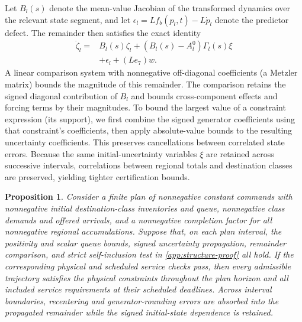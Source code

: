 \documentclass[preprint,12pt]{elsarticle}
\newtheorem{proposition}{Proposition}
\newcommand{\appref}[1]{\ref{#1}}
\begin{document}
Let $B_l(s)$ denote the mean-value Jacobian of the transformed dynamics over
the relevant state segment, and let
$\epsilon_l=L f_b(p_l,t)-L\dot p_l$ denote the predictor defect. The remainder
then satisfies the exact identity
\begin{equation}
 \begin{aligned}
 \dot\zeta_l={}&B_l(s)\zeta_l+(B_l(s)-A_l^0)\Gamma_l(s)\xi\\
              &+\epsilon_l+(Le_7)w.
 \end{aligned}
 \label{eq:structure-remainder-identity}
\end{equation}
A linear comparison system with nonnegative off-diagonal coefficients
(a Metzler matrix) bounds the magnitude of this remainder. The comparison
retains the signed diagonal contribution of $B_l$ and bounds cross-component
effects and forcing terms by their magnitudes. To bound the largest value of a constraint expression (its support), we
first combine the signed generator coefficients using that constraint's
coefficients, then apply absolute-value bounds to the resulting uncertainty
coefficients. This preserves cancellations between correlated state errors. Because
the same initial-uncertainty variables $\xi$ are retained across successive
intervals, correlations between regional totals and destination classes are
preserved, yielding tighter certification bounds.

\begin{proposition}
\label{prop:structure-plan}
Consider a finite plan of nonnegative constant commands with nonnegative
initial destination-class inventories and queue, nonnegative class demands and
offered arrivals, and a nonnegative completion factor for all nonnegative
regional accumulations. Suppose that, on each plan interval, the positivity
and scalar queue bounds, signed uncertainty propagation, remainder comparison,
and strict self-inclusion test in \appref{app:structure-proof} all hold. If the
corresponding physical and scheduled service checks pass, then every admissible
trajectory satisfies the physical constraints throughout the plan horizon and
all included service requirements at their scheduled deadlines. Across
interval boundaries, recentering and generator-rounding errors are absorbed
into the propagated remainder while the signed initial-state dependence is
retained.
\end{proposition}
\end{document}
